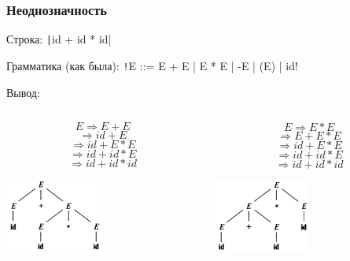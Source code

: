 \documentclass[xetex,mathserif,serif]{beamer}
\begin{document}
    \begin{frame}
        \frametitle{Неоднозначность}
        Строка: \texttt|id + id * id|

        Грамматика (как была): \texttt!E ::= E + E | E * E | -E | (E) | id!

        Вывод:
        \begin{columns}
            \begin{column}{0.5\textwidth}
                $$E \Rightarrow E + E$$
                $$\Rightarrow id + E$$
                $$\Rightarrow id + E * E$$
                $$\Rightarrow id + id * E$$
                $$\Rightarrow id + id * id$$
                \begin{center}
                    \includegraphics[width=0.5\textwidth]{ambiguousGrammarA.png}
                \end{center}
            \end{column}
            \begin{column}{0.5\textwidth}
                $$E \Rightarrow E * E$$
                $$\Rightarrow E + E * E$$
                $$\Rightarrow id + E * E$$
                $$\Rightarrow id + id * E$$
                $$\Rightarrow id + id * id$$
                \begin{center}
                    \includegraphics[width=0.5\textwidth]{ambiguousGrammarB.png}
                \end{center}
            \end{column}
        \end{columns}
    \end{frame}
\end{document}
